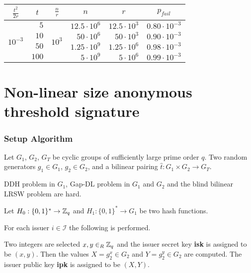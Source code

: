 \begin{center}
    \begin{tabular}{|c|r|c|r|r|c|}
        \hline
        $\frac{t^2}{2r}$ & \multicolumn{1}{c|}{$t$} & $\frac{n}{r}$ & \multicolumn{1}{c|}{$n$} & \multicolumn{1}{c|}{$r$} & $p_{fail}$ \\ \hline
        
        \multirow{4}{*}{$10^{-3}$} & $5$ & \multirow{4}{*}{$10^{3}$} & $12.5 \cdot 10^6$ & $12.5 \cdot 10^{3}$ & $0.80 \cdot 10^{-3}$ \\ \cline{2-2} \cline{4-6}
        & $10$ & & $50 \cdot 10^6$ & $50 \cdot 10^{3}$ & $0.90 \cdot 10^{-3}$ \\ \cline{2-2} \cline{4-6}
        & $50$ & & $1.25 \cdot 10^9$ & $1.25 \cdot 10^{6}$ & $0.98 \cdot 10^{-3}$ \\ \cline{2-2} \cline{4-6}
        & $100$ & & $5 \cdot 10^9$ & $5 \cdot 10^{6}$ & $0.99 \cdot 10^{-3}$ \\ \cline{2-2} \cline{4-6}
        
        \hline
    \end{tabular}
\end{center}



\section{Non-linear size anonymous threshold signature}
\cite{ChenNW11}
\subsubsection*{Setup Algorithm}

Let $G_1$, $G_2$, $G_T$ be cyclic groups of sufficiently large prime order $q$. Two random generators $g_1 \in G_1$, $g_2 \in G_2$, and a bilinear pairing $\hat{t}: G_1 \times G_2 \rightarrow G_T$.

DDH problem in $G_1$, Gap-DL problem in $G_1$ and $G_2$ and the blind bilinear LRSW problem are hard.

Let $H_0 : \{0,1\}^\ast \rightarrow {\mathbb Z}_q$ and $H_1 : \{ 0 , 1 \}^\ast \rightarrow G_1$ be two hash functions.

For each issuer $i \in \mathcal{I}$ the following is performed.

Two integers are selected $x,y \in_R {\mathbb Z}_q$ and the issuer secret key \textbf{isk} is assigned to be $(x,y)$. Then the values $X = g_2^{x} \in G_2$ and $Y = g_2^{y} \in G_2$ are computed. The issuer public key \textbf{ipk} is assigned to be $(X,Y)$.

